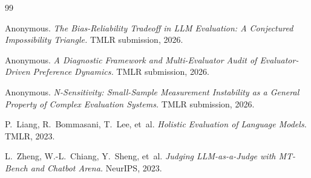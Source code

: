 \documentclass[11pt]{article}
\begin{document}
\begin{thebibliography}{99}

 Anonymous.
\newblock \textit{The Bias-Reliability Tradeoff in LLM Evaluation: A Conjectured Impossibility Triangle.}
\newblock TMLR submission, 2026.

 Anonymous.
\newblock \textit{A Diagnostic Framework and Multi-Evaluator Audit of Evaluator-Driven Preference Dynamics.}
\newblock TMLR submission, 2026.

 Anonymous.
\newblock \textit{N-Sensitivity: Small-Sample Measurement Instability as a General Property of Complex Evaluation Systems.}
\newblock TMLR submission, 2026.

 P.~Liang, R.~Bommasani, T.~Lee, et~al.
\newblock \textit{Holistic Evaluation of Language Models.}
\newblock TMLR, 2023.

 L.~Zheng, W.-L.~Chiang, Y.~Sheng, et~al.
\newblock \textit{Judging LLM-as-a-Judge with MT-Bench and Chatbot Arena.}
\newblock NeurIPS, 2023.

\end{thebibliography}
\end{document}
